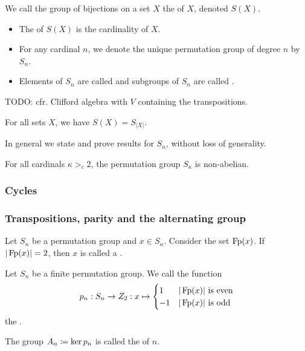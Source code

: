 \begin{definition}
We call the group of bijections on a set $X$ the  of $X$, denoted $S(X)$.
\begin{itemize}
\item The  of $S(X)$ is the cardinality of $X$.
\item For any cardinal $n$, we denote the unique permutation group of degree $n$ by $S_n$.
\item Elements of $S_n$ are called  and subgroups of $S_n$ are called .
\end{itemize}
\end{definition}

TODO: cfr. Clifford algebra with $V$ containing the transpositions.

\begin{proposition}
For all sets $X$, we have $S(X) = S_{|X|}$.
\end{proposition}
In general we state and prove results for $S_n$, without loss of generality.

\begin{lemma}
For all cardinals $\kappa >_c 2$, the permutation group $S_\kappa$ is non-abelian.
\end{lemma}

\subsubsection{Cycles}
\subsubsection{Transpositions, parity and the alternating group}
\begin{definition}
Let $S_n$ be a permutation group and $x\in S_n$. Consider the set $\operatorname{Fp}(x)$. If $|\operatorname{Fp}(x)| = 2$, then $x$ is called a .
\end{definition}

\begin{definition}
Let $S_n$ be a finite permutation group. We call the function
\[ p_n: S_n \to Z_2: x\mapsto \begin{cases}
1 & \text{$|\operatorname{Fp}(x)|$ is even} \\
-1 & \text{$|\operatorname{Fp}(x)|$ is odd}
\end{cases} \]
the .

The group $A_n \coloneqq \ker p_n$ is called the  of  $n$.
\end{definition}

